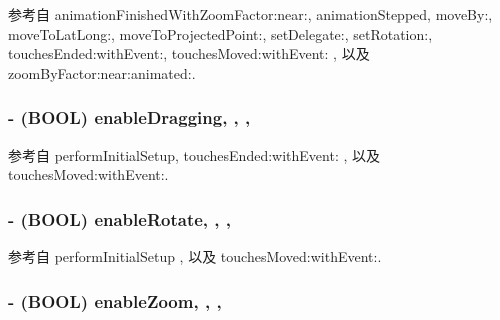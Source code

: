 参考自 animation\-Finished\-With\-Zoom\-Factor\-:near\-:, animation\-Stepped, move\-By\-:, move\-To\-Lat\-Long\-:, move\-To\-Projected\-Point\-:, set\-Delegate\-:, set\-Rotation\-:, touches\-Ended\-:with\-Event\-:, touches\-Moved\-:with\-Event\-: , 以及 zoom\-By\-Factor\-:near\-:animated\-:.

\hypertarget{interface_r_m_map_view_a3ce66092f0dcae73e0d209c9dab6c580}{
\subsubsection[{enable\-Dragging}]{\setlength{\rightskip}{0pt plus 5cm}-\/ (B\-O\-O\-L) enable\-Dragging\hspace{0.3cm}{\ttfamily [read]}, {\ttfamily [write]}, {\ttfamily [atomic]}, {\ttfamily [assign]}}}\label{interface_r_m_map_view_a3ce66092f0dcae73e0d209c9dab6c580}


参考自 perform\-Initial\-Setup, touches\-Ended\-:with\-Event\-: , 以及 touches\-Moved\-:with\-Event\-:.

\hypertarget{interface_r_m_map_view_a0be5c05b118052c1c802a4afda276d6c}{
\subsubsection[{enable\-Rotate}]{\setlength{\rightskip}{0pt plus 5cm}-\/ (B\-O\-O\-L) enable\-Rotate\hspace{0.3cm}{\ttfamily [read]}, {\ttfamily [write]}, {\ttfamily [atomic]}, {\ttfamily [assign]}}}\label{interface_r_m_map_view_a0be5c05b118052c1c802a4afda276d6c}


参考自 perform\-Initial\-Setup , 以及 touches\-Moved\-:with\-Event\-:.

\hypertarget{interface_r_m_map_view_a317f8fffb2cd671dd1c8b4fb90d4b7fa}{
\subsubsection[{enable\-Zoom}]{\setlength{\rightskip}{0pt plus 5cm}-\/ (B\-O\-O\-L) enable\-Zoom\hspace{0.3cm}{\ttfamily [read]}, {\ttfamily [write]}, {\ttfamily [atomic]}, {\ttfamily [assign]}}}\label{interface_r_m_map_view_a317f8fffb2cd671dd1c8b4fb90d4b7fa}


